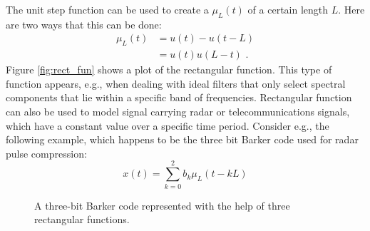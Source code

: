 The unit step function can be used to create a 
$\mu_L(t)$ of a certain length $L$. Here are two ways that this can be
done:
\begin{align*}
  \mu_L(t) & = u(t)-u(t-L)       \\
                    & = u(t) u(L-t) \,\,.
\end{align*}
Figure \ref{fig:rect_fun} shows a plot of the rectangular
function. This type of function appears, e.g., when dealing with ideal
filters that only select spectral components that lie within a
specific band of frequencies. Rectangular function can also be used to
model signal carrying radar or telecommunications signals, which have
a constant value over a specific time period. Consider e.g., the
following example, which happens to be the three bit Barker code used
for radar pulse compression:
\begin{equation}
x(t) = \sum_{k=0}^{2} b_k \mu_L(t-kL)
\end{equation}
  \begin{figure}
    \begin{center}
    \end{center}
    \caption{A three-bit Barker code represented with the help of three rectangular functions.}
      \label{fig:rectbarker}
  \end{figure}

